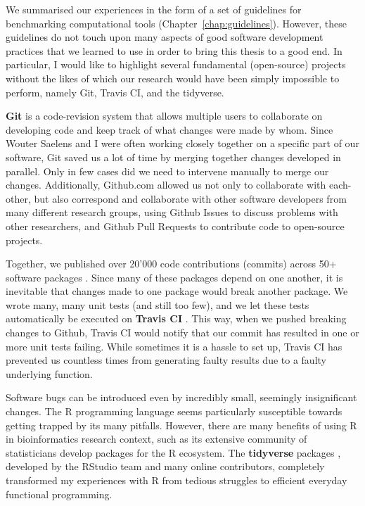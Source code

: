 We summarised our experiences in the form of a set of guidelines for benchmarking computational tools (Chapter~\ref{chap:guidelines}). However, these guidelines do not touch upon many aspects of good software development practices that we learned to use in order to bring this thesis to a good end. In particular, I would like to highlight several  fundamental (open-source) projects without the likes of which our research would have been simply impossible to perform, namely Git, Travis CI, and the tidyverse.

\textbf{Git} \cite{torvalds_gitfastversion_2005} is a code-revision system that allows multiple users to collaborate on developing code and keep track of what changes were made by whom. 
Since Wouter Saelens and I were often working closely together on a specific part of our software, Git saved us a lot of time by merging together changes developed in parallel. Only in few cases did we need to intervene manually to merge our changes.
Additionally, Github.com allowed us not only to collaborate with each-other, but also correspond and collaborate with other software developers from many different research groups, using Github Issues to discuss problems with other researchers, and Github Pull Requests to contribute code to open-source projects. 

Together, we published over 20'000 code contributions (commits) across 50+ software packages \cite{cannoodt_developmentdynverse_2019}. Since many of these packages depend on one another, it is inevitable that changes made to one package would break another package. We wrote many, many unit tests (and still too few), and we let these tests automatically be executed on \textbf{Travis CI} \cite{traviscigmbh_traviscitest_2011}. This way, when we pushed breaking changes to Github, Travis CI would notify that our commit has resulted in one or more unit tests failing. While sometimes it is a hassle to set up, Travis CI has prevented us countless times from generating faulty results due to a faulty underlying function.

Software bugs can be introduced even by incredibly small, seemingly insignificant changes. The R programming language seems particularly susceptible towards getting trapped by its many pitfalls. However, there are many benefits of using R in bioinformatics research context, such as its extensive community of statisticians develop packages for the R ecosystem. The \textbf{tidyverse} packages \cite{wickham_welcometidyverse_2019}, developed by the RStudio team and many online contributors, completely transformed my experiences with R from tedious struggles to efficient everyday functional programming.

